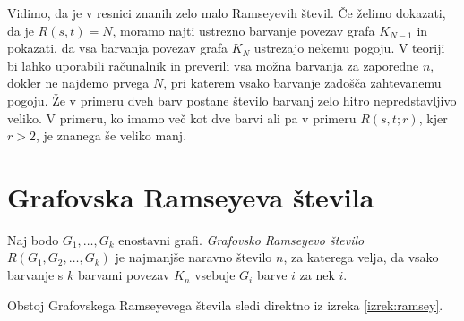 \documentclass[twoside,11pt]{article}
\begin{document}
Vidimo, da je v resnici znanih zelo malo Ramseyevih števil. Če želimo dokazati, 
da je $R(s, t) = N$, moramo najti ustrezno barvanje povezav grafa $K_{N-1}$ in pokazati, da 
vsa barvanja povezav grafa $K_{N}$ ustrezajo nekemu pogoju. V teoriji bi lahko uporabili računalnik 
in preverili vsa možna barvanja za zaporedne $n$, dokler ne najdemo prvega $N$, pri katerem vsako 
barvanje zadošča zahtevanemu pogoju. Že v primeru dveh barv postane število barvanj zelo hitro 
nepredstavljivo veliko. V primeru, ko imamo več kot dve barvi ali pa v primeru $R(s, t; r)$, kjer $r > 2$, je znanega še
veliko manj.

\section{Grafovska Ramseyeva števila}

\begin{definicija}
    Naj bodo $G_1, \dots, G_k$ enostavni grafi. \emph{Grafovsko Ramseyevo število}
    $R(G_1, G_2, \dots, G_k)$ je najmanjše naravno število $n$, za katerega velja, da 
    vsako barvanje s $k$ barvami povezav $K_n$ vsebuje $G_i$ barve $i$ za nek $i$. 
\end{definicija}

Obstoj Grafovskega Ramseyevega števila sledi direktno iz izreka \ref{izrek:ramsey}.
\end{document}
